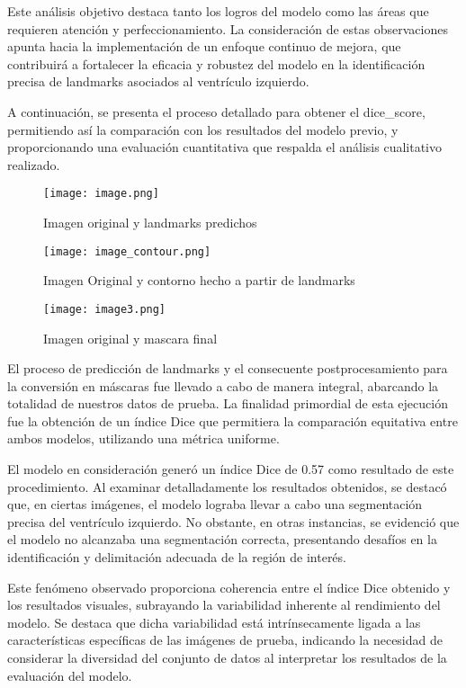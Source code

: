 \documentclass[runningheads]{llncs}
\begin{document}
Este análisis objetivo destaca tanto los logros del modelo como las áreas que requieren atención y perfeccionamiento. La consideración de estas observaciones apunta hacia la implementación de un enfoque continuo de mejora, que contribuirá a fortalecer la eficacia y robustez del modelo en la identificación precisa de landmarks asociados al ventrículo izquierdo.

A continuación, se presenta el proceso detallado para obtener el dice\_score, permitiendo así la comparación con los resultados del modelo previo, y proporcionando una evaluación cuantitativa que respalda el análisis cualitativo realizado.



\begin{figure} [H]
    \centering
    \texttt{[image: image.png]}
    \caption{Imagen original y landmarks predichos}
    \label{fig:enter-label}
\end{figure}
\begin{figure} [H]
    \centering
    \texttt{[image: image\_contour.png]}
    \caption{Imagen Original y contorno hecho a partir de landmarks}
    \label{fig:enter-label}
\end{figure}

\begin{figure} [H]
    \centering
    \texttt{[image: image3.png]}
    \caption{Imagen original y mascara final}
    \label{fig:enter-label}
\end{figure}

El proceso de predicción de landmarks y el consecuente postprocesamiento para la conversión en máscaras fue llevado a cabo de manera integral, abarcando la totalidad de nuestros datos de prueba. La finalidad primordial de esta ejecución fue la obtención de un índice Dice que permitiera la comparación equitativa entre ambos modelos, utilizando una métrica uniforme.

El modelo en consideración generó un índice Dice de 0.57 como resultado de este procedimiento. Al examinar detalladamente los resultados obtenidos, se destacó que, en ciertas imágenes, el modelo lograba llevar a cabo una segmentación precisa del ventrículo izquierdo. No obstante, en otras instancias, se evidenció que el modelo no alcanzaba una segmentación correcta, presentando desafíos en la identificación y delimitación adecuada de la región de interés.

Este fenómeno observado proporciona coherencia entre el índice Dice obtenido y los resultados visuales, subrayando la variabilidad inherente al rendimiento del modelo. Se destaca que dicha variabilidad está intrínsecamente ligada a las características específicas de las imágenes de prueba, indicando la necesidad de considerar la diversidad del conjunto de datos al interpretar los resultados de la evaluación del modelo.
\end{document}
